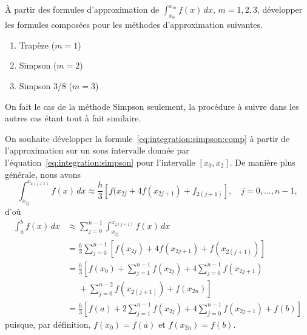 \begin{exercice}
  À partir des formules d'approximation de $\int_{x_0}^{x_m} f(x)\,
  dx$, $m = 1, 2, 3$, développer les formules composées pour les
  méthodes d'approximation suivantes.
  \begin{enumerate}
  \item Trapèze ($m = 1$)
  \item Simpson ($m = 2$)
  \item Simpson 3/8 ($m = 3$)
  \end{enumerate}
  \begin{sol}
    On fait le cas de la méthode Simpson seulement, la procédure à
    suivre dans les autres cas étant tout à fait similaire.

    On souhaite développer la
    formule~\eqref{eq:integration:simpson:comp} à partir de
    l'approximation sur un sous intervalle donnée par
    l'équation~\eqref{eq:integration:simpson} pour l'intervalle $[x_0,
    x_2]$. De manière plus générale, nous avons
    \begin{equation*}
      \int_{x_{2j}}^{x_{2(j + 1)}} f(x)\, dx \approx
      \frac{h}{3} [f(x_{2j} + 4 f(x_{2j + 1}) + f_{2(j + 1)}], \quad
      j = 0, \dots, n - 1,
    \end{equation*}
    d'où
    \begin{align*}
      \int_a^b f(x)\, dx
      &\approx \sum_{j = 0}^{n - 1}
      \int_{x_{2j}}^{x_{2(j + 1)}} f(x)\, dx \\
      &= \frac{h}{3} \sum_{j = 0}^{n - 1}
      [f(x_{2j}) + 4 f(x_{2j + 1}) + f(x_{2(j + 1)})] \\
      &= \frac{h}{3}
      \left[
        f(x_0) +
        \sum_{j = 1}^{n - 1} f(x_{2j}) +
        4 \sum_{j = 0}^{n - 1} f(x_{2j + 1})
      \right. \\
      &\phantom{=}  + \left.
        \sum_{j = 0}^{n - 2} f(x_{2(j + 1)}) +
        f(x_{2n})
      \right] \\
      &= \frac{h}{3}
      \left[
        f(a) +
        2 \sum_{j = 1}^{n - 1} f(x_{2j}) +
        4 \sum_{j = 0}^{n - 1} f(x_{2j + 1}) +
        f(b)
      \right]
    \end{align*}
    puisque, par définition, $f(x_0) = f(a)$ et $f(x_{2n}) = f(b)$.
  \end{sol}
\end{exercice}

